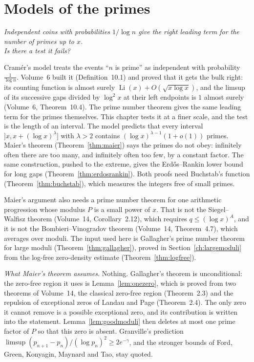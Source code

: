 \chapter{Models of the primes}\label{ch:oc-models}\label{ch:gaps}

\begin{center}\itshape
Independent coins with probabilities $1/\log n$ give the right leading term for the number of primes up to $x$.\\
Is there a test it fails?
\end{center}

Cram\'er's model treats the events ``$n$ is prime'' as independent with probability $\frac1{\log n}$. Volume~6 built it (Definition~10.1) and proved that it gets the bulk right: its counting function is almost surely $\operatorname{Li}(x)+O(\sqrt{x\log x})$, and the limsup of its successive gaps divided by $\log^2x$ at their left endpoints is $1$ almost surely (Volume~6, Theorem~10.4). The prime number theorem gives the same leading term for the primes themselves. This chapter tests it at a finer scale, and the test is the length of an interval. The model predicts that every interval $]x,x+(\log x)^\lambda]$ with $\lambda>2$ contains $(\log x)^{\lambda-1}(1+o(1))$ primes. Maier's theorem (Theorem~\ref{thm:maier}) says the primes do not obey: infinitely often there are too many, and infinitely often too few, by a constant factor. The same construction, pushed to the extreme, gives the Erd\H{o}s--Rankin lower bound for long gaps (Theorem~\ref{thm:erdosrankin}). Both proofs need Buchstab's function (Theorem~\ref{thm:buchstab}), which measures the integers free of small primes.

Maier's argument also needs a prime number theorem for one arithmetic progression whose modulus $P$ is a small power of $x$. That is not the Siegel--Walfisz theorem (Volume~14, Corollary~2.12), which requires $q\le(\log x)^A$, and it is not the Bombieri--Vinogradov theorem (Volume~14, Theorem~4.7), which averages over moduli. The input used here is Gallagher's prime number theorem for large moduli (Theorem~\ref{thm:gallagher}), proved in Section~\ref{ch:largemoduli} from the log-free zero-density estimate (Theorem~\ref{thm:logfree}).

\emph{What Maier's theorem assumes.} Nothing. Gallagher's theorem is unconditional: the zero-free region it uses is Lemma~\ref{lem:onezero}, which is proved from two theorems of Volume~14, the classical zero-free region (Theorem~2.3) and the repulsion of exceptional zeros of Landau and Page (Theorem~2.4). The only zero it cannot remove is a possible exceptional zero, and its contribution is written into the statement. Lemma~\ref{lem:goodmoduli} then deletes at most one prime factor of $P$ so that this zero is absent. Granville's prediction $\limsup(p_{n+1}-p_n)/(\log p_n)^2\ge 2e^{-\gamma}$, and the stronger bounds of Ford, Green, Konyagin, Maynard and Tao, stay quoted.


